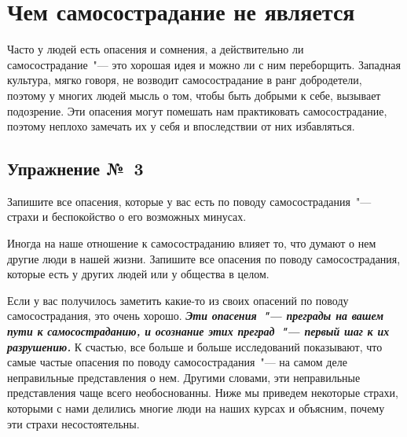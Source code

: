
\section{Чем самосострадание не является} \label{What_Self-Compassion_Is_Not}

Часто у людей есть опасения и сомнения, а действительно ли самосострадание~"--- это хорошая идея и можно ли с ним переборщить. Западная культура, мягко говоря, не возводит самосострадание в ранг добродетели, поэтому у многих людей мысль о том, чтобы быть добрыми к себе, вызывает подозрение. Эти опасения могут помешать нам практиковать самосострадание, поэтому неплохо замечать их у себя и впоследствии от них избавляться.

\subsection{Упражнение №~3}


\vspace{3ex}

Запишите все опасения, которые у вас есть по поводу самосострадания~"--- страхи и беспокойство о его возможных минусах.

\vfill

Иногда на наше отношение к самосостраданию влияет то, что думают о нем другие люди в нашей жизни. Запишите все опасения по поводу самосострадания, которые есть у других людей или у общества в целом.

\vfill


\newpage



\vspace{3ex}

Если у вас получилось заметить какие-то из своих опасений по поводу самосострадания, это очень хорошо. \textbf{\textit{Эти опасения~"--- преграды на вашем пути к самосостраданию, и осознание этих преград~"--- первый шаг к их разрушению.}} К счастью, все больше и больше исследований показывают, что самые частые опасения по поводу самосострадания~"--- на самом деле неправильные представления о нем. Другими словами, эти неправильные представления чаще всего необоснованны. Ниже мы приведем некоторые страхи, которыми с нами делились многие люди на наших курсах и объясним, почему эти страхи несостоятельны.

